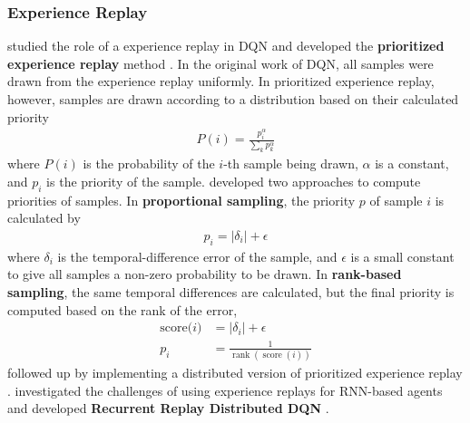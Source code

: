 \subsubsection{Experience Replay}
\citeauthor{PrioritizedExperienceReplay_Schaul.Quan.ea_2016} studied the role of a experience replay in DQN and developed the \textbf{prioritized experience replay} method \cite{PrioritizedExperienceReplay_Schaul.Quan.ea_2016}.
In the original work of DQN, all samples were drawn from the experience replay uniformly.
In prioritized experience replay, however, samples are drawn according to a distribution based on their calculated priority
\begin{align*}
    P(i)=\frac{p_{i}^{\alpha}}{\sum_{k} p_{k}^{\alpha}}
\end{align*}
where $P(i)$ is the probability of the $i$-th sample being drawn, $\alpha$ is a constant, and $p_i$ is the priority of the sample.
\citeauthor{PrioritizedExperienceReplay_Schaul.Quan.ea_2016} developed two approaches to compute priorities of samples.
In \textbf{proportional sampling}, the priority $p$ of sample $i$ is calculated by
\begin{align*}
    p_i = \left|\delta_{i}\right|+\epsilon
\end{align*}
where $\delta_{i}$ is the temporal-difference error of the sample, and $\epsilon$ is a small constant to give all samples a non-zero probability to be drawn.
In \textbf{rank-based sampling}, the same temporal differences are calculated, but the final priority is computed based on the rank of the error,
\begin{align*}
    \text{score($i$)}  & = \left|\delta_{i}\right|+\epsilon  \\
    p_{i}              & = \frac{1}{\operatorname{rank}(\operatorname{score}(i))}
\end{align*}
\citeauthor{DistributedPrioritizedExperience_Horgan.Quan.ea_2018} followed up by implementing a distributed version of prioritized experience replay \cite{DistributedPrioritizedExperience_Horgan.Quan.ea_2018}.
\citeauthor{RECURRENTEXPERIENCEREPLAY_Kapturowski.Ostrovski.ea_2019} investigated the challenges of using experience replays for RNN-based agents and developed \textbf{Recurrent Replay Distributed DQN} \cite{RECURRENTEXPERIENCEREPLAY_Kapturowski.Ostrovski.ea_2019}.

